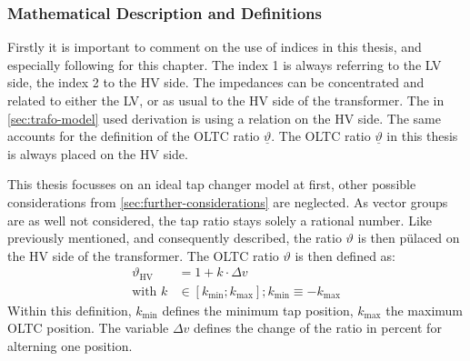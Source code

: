 \newpage
\subsubsection{Mathematical Description and Definitions}

Firstly it is important to comment on the use of indices in this thesis, and especially following for this chapter.
The index 1 is always referring to the \acs{LV} side, the index 2 to the \acs{HV} side. 
The impedances can be concentrated and related to either the \acs{LV}, or as usual to the \acs{HV} side of the transformer. 
The in \autoref{sec:trafo-model} used derivation is using a relation on the \acs{HV} side.
The same accounts for the definition of the \acs{OLTC} ratio $\underline{\vartheta}$.     
The \acs{OLTC} ratio $\underline{\vartheta}$ in this thesis is always placed on the HV side.

This thesis focusses on an ideal tap changer model at first, other possible considerations from \autoref{sec:further-considerations} are neglected.
As vector groups are as well not considered, the tap ratio stays solely a rational number.
Like previously mentioned, and consequently described, the ratio $\vartheta$ is then pülaced on the \acs{HV} side of the transformer.
The \acs{OLTC} ratio $\vartheta$ is then defined as:
\begin{align}
        \vartheta_\mathrm{HV} &= 1 + k \cdot \Delta v \label{eq:tap-ratio-hv} \\[6pt]
        \text{with } k &\in [k_\mathrm{min};k_\mathrm{max}]; k_\mathrm{min} \equiv  -k_\mathrm{max} \label{eq:tap-pos}
\end{align}
Within this definition, $k_\mathrm{min}$ defines the minimum tap position, $k_\mathrm{max}$ the maximum \acs{OLTC} position. 
The variable $\Delta v$ defines the change of the ratio in percent for alterning one position.


